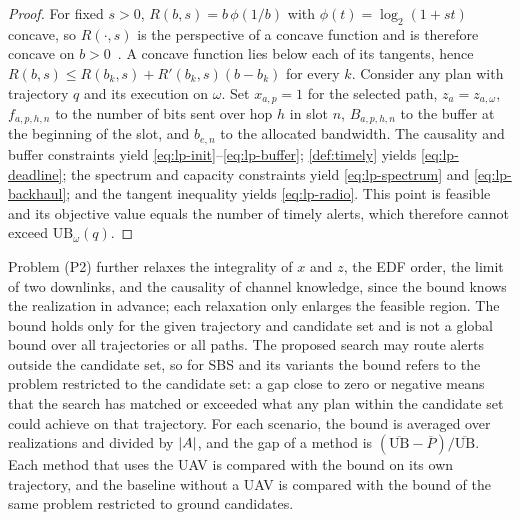 
\begin{proof}
For fixed $s>0$, $R(b,s)=b\,\phi(1/b)$ with $\phi(t)=\log_2(1+st)$ concave, so $R(\cdot,s)$ is the perspective of a concave function and is therefore concave on $b>0$~\cite{boyd2004convex}. A concave function lies below each of its tangents, hence $R(b,s)\le R(b_k,s)+R'(b_k,s)(b-b_k)$ for every $k$.
Consider any plan with trajectory $q$ and its execution on $\omega$. Set $x_{a,p}=1$ for the selected path, $z_a=z_{a,\omega}$, $f_{a,p,h,n}$ to the number of bits sent over hop $h$ in slot $n$, $B_{a,p,h,n}$ to the buffer at the beginning of the slot, and $b_{e,n}$ to the allocated bandwidth. The causality and buffer constraints yield \eqref{eq:lp-init}--\eqref{eq:lp-buffer}; \cref{def:timely} yields \eqref{eq:lp-deadline}; the spectrum and capacity constraints yield \eqref{eq:lp-spectrum} and \eqref{eq:lp-backhaul}; and the tangent inequality yields \eqref{eq:lp-radio}. This point is feasible and its objective value equals the number of timely alerts, which therefore cannot exceed $\mathrm{UB}_\omega(q)$.
\end{proof}

Problem (P2) further relaxes the integrality of $x$ and $z$, the EDF order, the limit of two downlinks, and the causality of channel knowledge, since the bound knows the realization in advance; each relaxation only enlarges the feasible region. The bound holds only for the given trajectory and candidate set and is not a global bound over all trajectories or all paths. The proposed search may route alerts outside the candidate set, so for SBS and its variants the bound refers to the problem restricted to the candidate set: a gap close to zero or negative means that the search has matched or exceeded what any plan within the candidate set could achieve on that trajectory. For each scenario, the bound is averaged over realizations and divided by $\lvert A\rvert$, and the gap of a method is $(\overline{\mathrm{UB}}-\overline{P})/\overline{\mathrm{UB}}$. Each method that uses the UAV is compared with the bound on its own trajectory, and the baseline without a UAV is compared with the bound of the same problem restricted to ground candidates.


